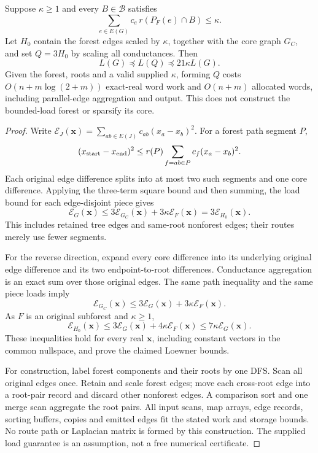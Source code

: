 \begin{theorem}
\label{thm:op3-rooted-piece-spectral-comparison}
Suppose $\kappa\geq1$ and every $B\in\mathcal B$ satisfies
\[
 \sum_{e\in E(G)} c_e\,r(P_F(e)\cap B)\leq\kappa.
\]
Let $H_0$ contain the forest edges scaled by $\kappa$, together with
the core graph $G_C$, and set $Q=3H_0$ by scaling all conductances.
Then
\[
 L(G)\preceq L(Q)\preceq21\kappa L(G).
\]
Given the forest, roots and a valid supplied $\kappa$, forming $Q$ costs
$O(n+m\log(2+m))$ exact-real word work and $O(n+m)$ allocated words,
including parallel-edge aggregation and output. This does not construct
the bounded-load forest or sparsify its core.
\end{theorem}
\begin{proof}
Write $\mathcal E_J(\bm x)=\sum_{ab\in E(J)}c_{ab}(x_a-x_b)^2$.
For a forest path segment $P$,
\[
 (x_{\rm start}-x_{\rm end})^2
 \leq r(P)\sum_{f=ab\in P}c_f(x_a-x_b)^2.
\]
Each original edge difference splits into at most two such segments
and one core difference. Applying the three-term square bound and
then summing, the load bound for each edge-disjoint piece gives
\[
 \mathcal E_G(\bm x)
 \leq3\mathcal E_{G_C}(\bm x)+3\kappa\mathcal E_F(\bm x)
 =3\mathcal E_{H_0}(\bm x).
\]
This includes retained tree edges and same-root nonforest edges; their
routes merely use fewer segments.

For the reverse direction, expand every core difference into its
underlying original edge difference and its two endpoint-to-root
differences. Conductance aggregation is an exact sum over those original
edges. The same path inequality and the same piece loads imply
\[
 \mathcal E_{G_C}(\bm x)
 \leq3\mathcal E_G(\bm x)+3\kappa\mathcal E_F(\bm x).
\]
As $F$ is an original subforest and $\kappa\geq1$,
\[
 \mathcal E_{H_0}(\bm x)
 \leq3\mathcal E_G(\bm x)+4\kappa\mathcal E_F(\bm x)
 \leq7\kappa\mathcal E_G(\bm x).
\]
These inequalities hold for every real $\bm x$, including constant
vectors in the common nullspace, and prove the claimed Loewner bounds.

For construction, label forest components and their roots by one DFS.
Scan all original edges once. Retain and scale forest edges; move each
cross-root edge into a root-pair record and discard other nonforest
edges. A comparison sort and one merge scan aggregate the root pairs.
All input scans, map arrays, edge records, sorting buffers, copies and
emitted edges fit the stated work and storage bounds. No route path or
Laplacian matrix is formed by this construction. The supplied load
guarantee is an assumption, not a free numerical certificate.
\end{proof}

